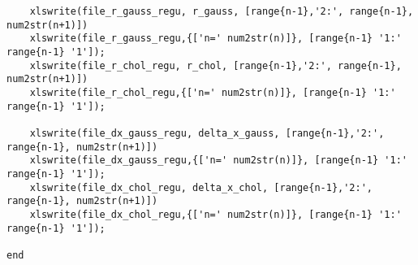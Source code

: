 \documentclass[a4paper]{article}
\begin{document}
\begin{CJK*}{GBK}{song}
\begin{enumerate}[(1)]
\begin{lstlisting}
    xlswrite(file_r_gauss_regu, r_gauss, [range{n-1},'2:', range{n-1}, num2str(n+1)])
    xlswrite(file_r_gauss_regu,{['n=' num2str(n)]}, [range{n-1} '1:' range{n-1} '1']);
    xlswrite(file_r_chol_regu, r_chol, [range{n-1},'2:', range{n-1}, num2str(n+1)])
    xlswrite(file_r_chol_regu,{['n=' num2str(n)]}, [range{n-1} '1:' range{n-1} '1']);

    xlswrite(file_dx_gauss_regu, delta_x_gauss, [range{n-1},'2:', range{n-1}, num2str(n+1)])
    xlswrite(file_dx_gauss_regu,{['n=' num2str(n)]}, [range{n-1} '1:' range{n-1} '1']);
    xlswrite(file_dx_chol_regu, delta_x_chol, [range{n-1},'2:', range{n-1}, num2str(n+1)])
    xlswrite(file_dx_chol_regu,{['n=' num2str(n)]}, [range{n-1} '1:' range{n-1} '1']);

end
\end{lstlisting}
\end{enumerate}




\end{CJK*}
\end{document}

